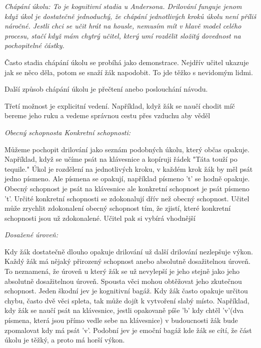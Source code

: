 \em Chápání úkolu\em : To je kognitivní stadia u Andersona. Drilování funguje jenom když úkol je dostatečně jednoduchý, že chápání jednotlivých kroků úkolu není příliš náročné.  Jestli chci se učit hrát na housle, nemusím mít v hlavě model celého procesu, stačí když mám chytrý učitel, který umí rozdělit složitý dovednost na pochopitelné částky.

Často stadia chápání úkolu se probíhá jako demonstrace.  Nejdřív učitel ukazuje jak se něco děla, potom se snaží žák napodobit.  To jde těžko s nevidomým lidmi.

Další způsob chápání úkolu je přečtení anebo poslouchání návodu.

Třetí možnost je explicitní vedení.  Například, když žák se naučí chodit míč bereme jeho ruku a vedeme správnou cestu přes vzduchu aby věděl 


\em Obecný schopnost\em a \em Konkretní schopnosti\em :

Můžeme pochopit drilování jako seznám podobných úkolu, který občas opakuje.  Například, když se učíme psát na klávesnice a kopíruji řádek "Táta touží po tequile." Úkol je rozdělení na jednotlivých kroku, v každém krok žák by měl psát jedno písmeno.  Ale písmena se opakují, například písmeno 't' se hodně opakuje.  Obecný schopnost je psát na klávesnice ale konkretní schopnost je psát písmeno 't'. Určité konkretní schopnosti se zdokonalují dřív než obecný schopnost. Učitel může zrychlit zdokonalení obecný schopnost tím, že zjistí, které konkretní schopnosti jsou už zdokonalené.  Učitel pak si vybírá vhodnější 

\em Dosažené úroveň\em :

Kdy žák dostatečně dlouho opakuje drilování už další drilování nezlepšuje výkon.  Každý žák má nějaký přirozený schopnost anebo absolutně dosažitelnou úroveň.  To neznamená, že úroveň u který žák se už nevylepší je jeho stejně jako jeho absolutně dosažitelnou úroveň.  Spousta věci mohou obtěžovat jeho zkutečnou schopnost.  Jeden škodní jev je kognitivní bagáž. Kdy žák často opakuje určitou chybu, často dvě věci spleta, tak může dojít k vytvoření slabý místo. Například, kdy žák se naučí psát na klávesnice, jestli opakovaně píše 'b' kdy chtěl 'v'(dva písmena, která jsou přímo vedle sebe na klávesnice) v budoucnosti žák bude zpomalovat kdy má psát 'v'. Podobní jev je emoční bagáž kde žák se cítí, že část úkolu je těžký, a proto má horší výkon.
